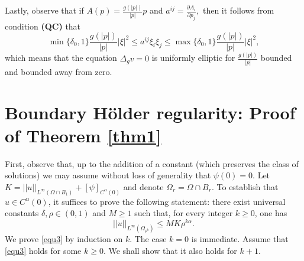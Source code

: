 \documentclass[11pt, leqno]{article}
\theoremstyle{definition}
\theoremstyle{remark}
\numberwithin{equation}{section}
\begin{document}
Lastly, observe that if $A(p)=\frac{g(|p|)}{|p|}p$ and $a^{ij}=\frac{\partial A_i}{\partial p_j},$ then it follows from condition {\bf (QC)} that
 $$\min\{\delta_0, 1\}\frac{g(|p|)}{|p|}|\xi|^2 \leq a^{ij}\xi_i\xi_j \leq \max\{\delta_0, 1\}\frac{g(|p|)}{|p|}|\xi|^2,   $$
which means that the equation $\Delta_gv=0$ is uniformly elliptic for $\frac{g(|p|)}{|p|}$ bounded and bounded away from zero.




\section{Boundary Hölder regularity: Proof of Theorem \ref{thm1}}\label{Sec3}

First, observe that, up to the addition of a constant (which preserves the class of solutions) we may assume without loss of generality that
 $\psi(0)=0.$ Let $K=||u||_{L^\infty(\Omega\cap B_1)}+ [\psi]_{C^\alpha(0)}$ and denote $\Omega_r=\Omega\cap B_r.$ To establish that \(u\in C^\alpha(0)\), it suffices to prove the following statement: there exist universal constants \(\delta,\rho\in(0,1)\) and \(M\ge 1\) such that, for every integer \(k\ge 0\), one has
  \begin{equation}\label{equ3}
      ||u||_{L^\infty(\Omega_{\rho^k})} \leq M K \rho^{k\alpha}.
  \end{equation}
 We prove \eqref{equ3} by induction on \(k\). The case \(k=0\) is immediate. Assume that \eqref{equ3} holds for some \(k\geq 0\). We shall show that it also holds for \(k+1\).
\end{document}
